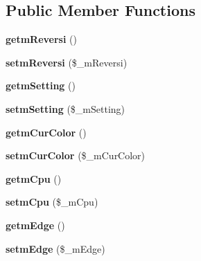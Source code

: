 \subsection*{Public Member Functions}
\begin{DoxyCompactItemize}
\item 
\mbox{\label{class_reversi_play_a88069db3b0a3146d0dcc7771410fd895}} 
{\bfseries getm\+Reversi} ()
\item 
\mbox{\label{class_reversi_play_a39c396a4fad5f72261d628f5018f268e}} 
{\bfseries setm\+Reversi} (\$\+\_\+m\+Reversi)
\item 
\mbox{\label{class_reversi_play_a1c2a765d1aefb409fd3e39688140ba21}} 
{\bfseries getm\+Setting} ()
\item 
\mbox{\label{class_reversi_play_a0f01407d5c9237e3bc10e9317dc3d3aa}} 
{\bfseries setm\+Setting} (\$\+\_\+m\+Setting)
\item 
\mbox{\label{class_reversi_play_a45b05e31f8be40c86e4e23948a05771b}} 
{\bfseries getm\+Cur\+Color} ()
\item 
\mbox{\label{class_reversi_play_a94119d2910f42dd78f7039f9d848c06c}} 
{\bfseries setm\+Cur\+Color} (\$\+\_\+m\+Cur\+Color)
\item 
\mbox{\label{class_reversi_play_ac0571dfe3aa8b4f2d83ffda38eff9570}} 
{\bfseries getm\+Cpu} ()
\item 
\mbox{\label{class_reversi_play_a5cc7789f378a0767a17d8eddf5910005}} 
{\bfseries setm\+Cpu} (\$\+\_\+m\+Cpu)
\item 
\mbox{\label{class_reversi_play_ada26f3681011904528f3e3dfed9f17df}} 
{\bfseries getm\+Edge} ()
\item 
\mbox{\label{class_reversi_play_a6888b14f2d98174e4a2e5886a902a8b0}} 
{\bfseries setm\+Edge} (\$\+\_\+m\+Edge)
\item 
\mbox{\label{class_reversi_play_abc896b77f0242458a6137a1f5c3501ed}} 

\end{DoxyCompactItemize}
